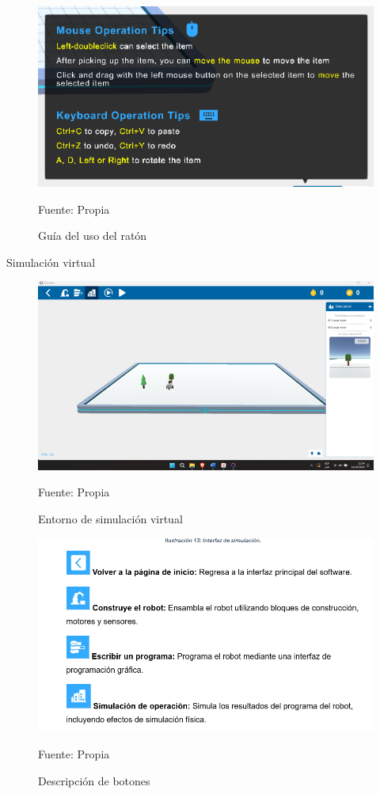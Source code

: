 \begin{figure}[H]
    \centering
    \includegraphics[scale = 0.90]{Imagenes/intr_Raton.png}
    \caption{Guía del uso del ratón}{Fuente: Propia}
\end{figure}

Simulación virtual

\begin{figure}[H]
    \centering
    \includegraphics[scale = 0.90]{Imagenes/simulacion_virtual.png}
    \caption{Entorno de simulación virtual}{Fuente: Propia}
\end{figure}

\begin{figure}[H]
    \centering
    \includegraphics[scale = 0.90]{Imagenes/descripcipn_botones.png}
    \caption{Descripción de botones}{Fuente: Propia}
\end{figure}

